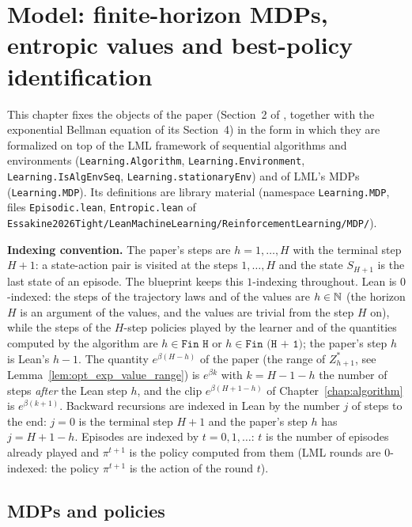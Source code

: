 \chapter{Model: finite-horizon MDPs, entropic values and best-policy identification}
\label{chap:mdp}

This chapter fixes the objects of the paper (Section~2 of \cite{essakine2026tight}, together
with the exponential Bellman equation of its Section~4) in the form in which they are
formalized on top of the LML framework of sequential algorithms and environments
(\texttt{Learning.Algorithm}, \texttt{Learning.Environment}, \texttt{Learning.IsAlgEnvSeq},
\texttt{Learning.stationaryEnv}) and of LML's MDPs (\texttt{Learning.MDP}). Its definitions are
library material (namespace \texttt{Learning.MDP}, files \texttt{Episodic.lean},
\texttt{Entropic.lean} of \texttt{Essakine2026Tight/LeanMachineLearning/ReinforcementLearning/MDP/}).

\textbf{Indexing convention.} The paper's steps are $h = 1, \dots, H$ with the terminal step
$H + 1$: a state-action pair is visited at the steps $1, \dots, H$ and the state $S_{H+1}$ is
the last state of an episode. The blueprint keeps this $1$-indexing throughout. Lean is
$0$-indexed: the steps of the trajectory laws and of the values are $h \in \mathbb{N}$ (the horizon
$H$ is an argument of the values, and the values are trivial from the step $H$ on), while the
steps of the $H$-step policies played by the learner and of the quantities computed by the
algorithm are $h \in \texttt{Fin H}$ or $h \in \texttt{Fin (H + 1)}$; the paper's step $h$ is
Lean's $h - 1$. The quantity
$e^{\beta(H - h)}$ of the paper (the range of $Z^*_{h+1}$, see Lemma~\ref{lem:opt_exp_value_range})
is $e^{\beta k}$ with $k = H - 1 - h$ the number of steps \emph{after} the Lean step $h$, and the
clip $e^{\beta(H + 1 - h)}$ of Chapter~\ref{chap:algorithm} is $e^{\beta(k + 1)}$. Backward
recursions are indexed in Lean by the number $j$ of steps to the end: $j = 0$ is the terminal
step $H + 1$ and the paper's step $h$ has $j = H + 1 - h$. Episodes are indexed by
$t = 0, 1, \dots$: $t$ is the number of episodes already played and $\pi^{t+1}$ is the policy
computed from them (LML rounds are $0$-indexed: the policy $\pi^{t+1}$ is the action of the
round $t$).

\section{MDPs and policies}
\label{sec:mdp_mdps}

